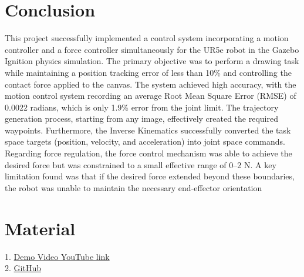 

\section{Conclusion}
This project successfully implemented a control system incorporating a motion controller and a force controller simultaneously for the UR5e robot in the Gazebo Ignition physics simulation. The primary objective was to perform a drawing task while maintaining a position tracking error of less than 10\% and controlling the contact force applied to the canvas. The system achieved high accuracy, with the motion control system recording an average Root Mean Square Error (RMSE) of 0.0022 radians, which is only 1.9\% error from the joint limit. The trajectory generation process, starting from any image, effectively created the required waypoints. Furthermore, the Inverse Kinematics successfully converted the task space targets (position, velocity, and acceleration) into joint space commands. Regarding force regulation, the force control mechanism was able to achieve the desired force but was constrained to a small effective range of 0–2 N. A key limitation found was that if the desired force extended beyond these boundaries, the robot was unable to maintain the necessary end-effector orientation

\newpage
\section {Material}
1. \href{https://youtu.be/wwcuVrQiC04}{Demo Video YouTube link}\\
2. \href{https://github.com/Tien-Jirattanun/UR5e_drawing}{GitHub}